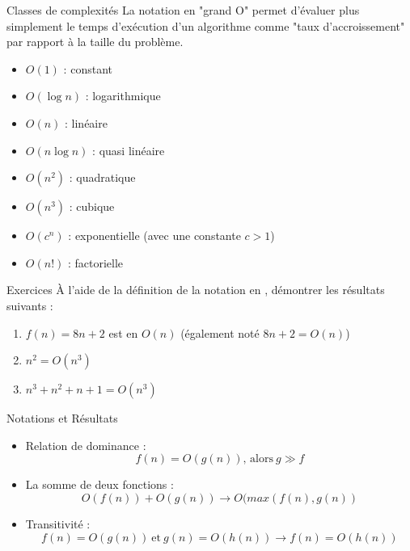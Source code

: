 \documentclass[handout]{beamer}
\let\emph\relax %
\begin{document}
\begin{frame}[t]{Classes de complexités}
    La notation en "grand O" permet d'évaluer plus simplement le temps d'exécution d'un algorithme comme "taux d'accroissement" par rapport à la taille du problème.

    \begin{itemize}
        \item $O(1)$ : constant
        \item $O(\log n)$ : logarithmique
        \item $O(n)$ : linéaire
        \item $O(n \log n)$ : quasi linéaire
        \item $O(n^2)$ : quadratique
        \item $O(n^3)$ : cubique
        \item $O(c^n)$ : exponentielle (avec une constante $c > 1$)
        \item $O(n!)$ : factorielle
    \end{itemize}
\end{frame}

\begin{frame}[t]{Exercices}
À l'aide de la définition de la notation en \emph{grand O}, démontrer les résultats suivants :
\begin{enumerate}
    \item $f(n) = 8n + 2$ est en $O(n)$ (également noté $8n + 2 = O(n)$)
    \item $n^2 = O(n^3)$
    \item $n^3 + n^2 + n + 1 = O(n^3)$
\end{enumerate}
\end{frame}

\begin{frame}[t]{Notations et Résultats}
\begin{itemize}
    \item Relation de dominance :
        $$
        f(n) = O(g(n))\text{, alors}\ g \gg f
        $$
    \item La somme de deux fonctions :
        $$
        O(f(n)) + O(g(n)) \rightarrow O(max(f(n), g(n))
        $$
    \item Transitivité :
        $$
        f(n) = O(g(n))\ \text{et}\ g(n) = O(h(n)) \rightarrow f(n) = O(h(n))
        $$
\end{itemize}
\end{frame}
\end{document}
